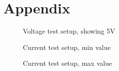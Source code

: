 \newpage
\section{Appendix}
\label{sec:appendix}

\begin{figure}[h]
    \centering
    \caption{Voltage test setup, showing 5V}
    \label{fig:VM1}
\end{figure}

\begin{figure}[h]
    \centering
    \caption{Current test setup, min value}
    \label{fig:CM1}
\end{figure}

\begin{figure}[h]
    \centering
    \caption{Current test setup, max value}
    \label{fig:CM2}
\end{figure}

